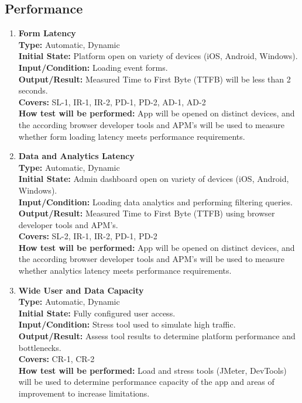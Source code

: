 \documentclass[12pt, titlepage]{article}
\begin{document}
\subsection{Performance}
\begin{enumerate}[label=\bfseries PF-\arabic*:, wide=0pt]
  \item \label{test-PF1} \textbf{Form Latency}\\[2mm]
    {\bf Type:} Automatic, Dynamic\\
    {\bf Initial State:} Platform open on variety of devices (iOS, Android, Windows).\\
    {\bf Input/Condition:} Loading event forms.\\
    {\bf Output/Result:} Measured Time to First Byte (TTFB) will be less than 2 seconds.\\
    {\bf Covers:} SL-1, IR-1, IR-2, PD-1, PD-2, AD-1, AD-2\\
    {\bf How test will be performed:} App will be opened on distinct devices, and the according browser developer tools and APM's will be used to measure whether form loading latency meets performance requirements.

  \item \label{test-PF2} \textbf{Data and Analytics Latency}\\[2mm]
    {\bf Type:} Automatic, Dynamic\\
    {\bf Initial State:} Admin dashboard open on variety of devices (iOS, Android, Windows).\\
    {\bf Input/Condition:} Loading data analytics and performing filtering queries.\\
    {\bf Output/Result:} Measured Time to First Byte (TTFB) using browser developer tools and APM's.\\
    {\bf Covers:} SL-2, IR-1, IR-2, PD-1, PD-2\\
    {\bf How test will be performed:} App will be opened on distinct devices, and the according browser developer tools and APM's will be used to measure whether analytics latency meets performance requirements.

  \item \label{test-PF4} \textbf{Wide User and Data Capacity}\\[2mm]
    {\bf Type:} Automatic, Dynamic\\
    {\bf Initial State:} Fully configured user access.\\
    {\bf Input/Condition:} Stress tool used to simulate high traffic.\\
    {\bf Output/Result:} Assess tool results to determine platform performance and bottlenecks.\\
    {\bf Covers:} CR-1, CR-2\\
    {\bf How test will be performed:} Load and stress tools (JMeter, DevTools) will be used to determine performance capacity of the app and areas of improvement to increase limitations.  


\end{enumerate}
\end{document}
